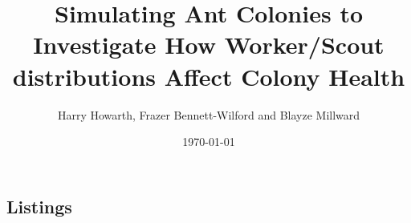 \documentclass[11pt,oneside,titlepage]{article}
\begin{document}
  \title{Simulating Ant Colonies to Investigate How Worker/Scout distributions Affect Colony Health}
  \author{Harry Howarth, Frazer Bennett-Wilford and Blayze Millward}
  \date{\today}
  \maketitle
  
  
  
  
  
  
  
  
  
  
  
  \newpage
  
  

  \newpage
  \begin{appendix}
    \listoffigures
    \listoftables
    \section*{Listings}
  \end{appendix}
  
\end{document}
